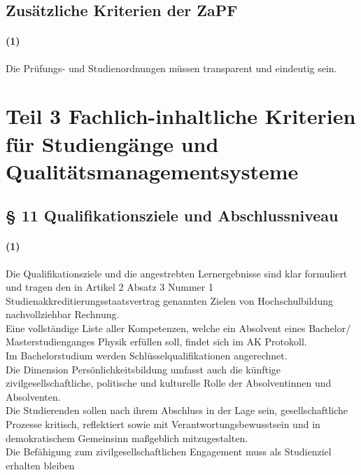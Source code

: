 \documentclass[a4paper]{scrartcl}
\begin{document}
\textcolor{Bernd}{\subsection{Zusätzliche Kriterien der ZaPF}
\paragraph{(1)}  \textbf{\cite{RESO: SoSe2010-BaMa}} Die Prüfungs- und Studienordnungen müssen transparent und eindeutig sein.}

\section{Teil 3 Fachlich-inhaltliche Kriterien für Studiengänge und
Qualitätsmanagementsysteme}
\subsection{§ 11 Qualifikationsziele und Abschlussniveau}
\paragraph{(1)} Die Qualifikationsziele und die angestrebten Lernergebnisse sind klar formuliert und tragen den in Artikel 2 Absatz 3 Nummer 1 Studienakkreditierungsstaatsvertrag genannten Zielen von Hochschulbildung nachvollziehbar Rechnung.\\

\textcolor{Bernd}{\textbf{\cite{PROT: SoSe2016-Komp}} Eine vollständige Liste aller Kompetenzen, welche ein Absolvent eines Bachelor/ Masterstudienganges Physik erfüllen soll, findet sich im AK Protokoll.}\\

\textcolor{Bernd}{\textbf{\cite{RESO: SoSe2002-RL}} Im Bachelorstudium werden Schlüsselqualifikationen angerechnet.}\\

Die Dimension Persönlichkeitsbildung umfasst auch die künftige zivilgesellschaftliche, politische und kulturelle Rolle der Absolventinnen und Absolventen.\\



Die Studierenden sollen nach ihrem Abschluss in der Lage sein, gesellschaftliche Prozesse kritisch, reflektiert sowie mit Verantwortungsbewusstsein und in demokratischem Gemeinsinn maßgeblich mitzugestalten.\\

\textcolor{Bernd}{\textbf{\cite{RESO: WiSe2017-Akkwesen}}
Die Befähigung zum zivilgesellschaftlichen Engagement muss als Studienziel
erhalten bleiben}\\
\end{document}
